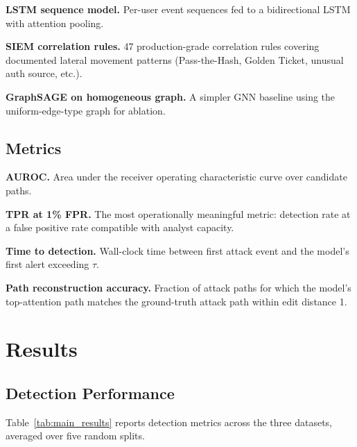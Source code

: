 \documentclass[sigconf,nonacm]{acmart}
\begin{document}
\textbf{LSTM sequence model.} Per-user event sequences fed to a
bidirectional LSTM with attention pooling.

\textbf{SIEM correlation rules.} 47 production-grade correlation rules
covering documented lateral movement patterns (Pass-the-Hash, Golden Ticket,
unusual auth source, etc.).

\textbf{GraphSAGE on homogeneous graph.} A simpler GNN baseline using the
uniform-edge-type graph for ablation.

\subsection{Metrics}

\textbf{AUROC.} Area under the receiver operating characteristic curve over
candidate paths.

\textbf{TPR at 1\% FPR.} The most operationally meaningful metric: detection
rate at a false positive rate compatible with analyst capacity.

\textbf{Time to detection.} Wall-clock time between first attack event and
the model's first alert exceeding $\tau$.

\textbf{Path reconstruction accuracy.} Fraction of attack paths for which the
model's top-attention path matches the ground-truth attack path within edit
distance 1.

\section{Results}
\label{sec:results}

\subsection{Detection Performance}

Table~\ref{tab:main_results} reports detection metrics across the three
datasets, averaged over five random splits.

\begin{table}[h]
\caption{Detection Performance (mean across LANL/OpTC/testbed)}
\label{tab:main_results}
\end{table}
\end{document}
